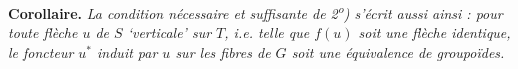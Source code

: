 \documentclass[11pt]{article}
\begin{document}
\textbf{Corollaire.} \textit{La condition nécessaire et suffisante de 2\textsuperscript{o}) s'écrit aussi ainsi : pour toute flèche $u$ de $S$ ‘verticale’ sur $T$, i.e. telle que $f(u)$ soit une flèche identique, le foncteur $u^*$ induit par $u$ sur les fibres de $G$ soit une équivalence de groupoïdes.}
\end{document}

